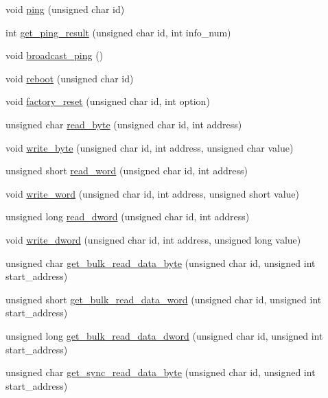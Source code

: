 \begin{DoxyCompactItemize}
void \hyperlink{classdynamixel2_abf94a0932647959fff04aed5c6708f79}{ping} (unsigned char id)
\item 
int \hyperlink{classdynamixel2_a13fcec580551a263fcb4e4aad311ace0}{get\+\_\+ping\+\_\+result} (unsigned char id, int info\+\_\+num)
\item 
void \hyperlink{classdynamixel2_a79993ea3bc2230635d9e3d9e2f9ec27c}{broadcast\+\_\+ping} ()
\item 
void \hyperlink{classdynamixel2_a674ea4cce4a1f807c0749ac7eb685cd6}{reboot} (unsigned char id)
\item 
void \hyperlink{classdynamixel2_ab10d0f6f3c77e02dc028ba19ac55c609}{factory\+\_\+reset} (unsigned char id, int option)
\item 
unsigned char \hyperlink{classdynamixel2_ae7641411f8eea1d9e14afceb303bc93c}{read\+\_\+byte} (unsigned char id, int address)
\item 
void \hyperlink{classdynamixel2_ae511ba1af88cae4f3307d50242491011}{write\+\_\+byte} (unsigned char id, int address, unsigned char value)
\item 
unsigned short \hyperlink{classdynamixel2_a9b31ab524b63e309ce9f23fde56eb437}{read\+\_\+word} (unsigned char id, int address)
\item 
void \hyperlink{classdynamixel2_aa74bdf1e52647d6b3d290b09eac32f1d}{write\+\_\+word} (unsigned char id, int address, unsigned short value)
\item 
unsigned long \hyperlink{classdynamixel2_adb108e5166ba4beee4138e26ef16d1a4}{read\+\_\+dword} (unsigned char id, int address)
\item 
void \hyperlink{classdynamixel2_a502f5c430f5370ab7f158204c5631ac7}{write\+\_\+dword} (unsigned char id, int address, unsigned long value)
\item 
unsigned char \hyperlink{classdynamixel2_a3d32eb232e64ceb94b007268da2c05a3}{get\+\_\+bulk\+\_\+read\+\_\+data\+\_\+byte} (unsigned char id, unsigned int start\+\_\+address)
\item 
unsigned short \hyperlink{classdynamixel2_a5ba5fc3f030b88dd3dc889ab74724243}{get\+\_\+bulk\+\_\+read\+\_\+data\+\_\+word} (unsigned char id, unsigned int start\+\_\+address)
\item 
unsigned long \hyperlink{classdynamixel2_a2a896c35eab94d52c5b5e795daa978a3}{get\+\_\+bulk\+\_\+read\+\_\+data\+\_\+dword} (unsigned char id, unsigned int start\+\_\+address)
\item 
unsigned char \hyperlink{classdynamixel2_a30691b3d428a8937cc53142e3c22e94f}{get\+\_\+sync\+\_\+read\+\_\+data\+\_\+byte} (unsigned char id, unsigned int start\+\_\+address)

\end{DoxyCompactItemize}
